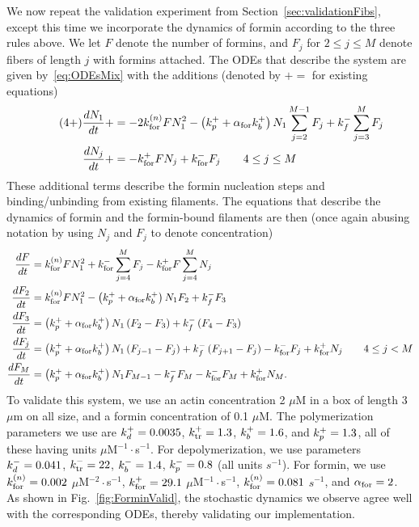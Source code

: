 \documentclass[11pt]{article}
\begin{document}
\begin{appendices}
We now repeat the validation experiment from Section\ \ref{sec:validationFibs}, except this time we incorporate the dynamics of formin according to the three rules above. We let $F$ denote the number of formins, and $F_j$ for $2 \leq j \leq M$ denote fibers of length $j$ with formins attached. The ODEs that describe the system are given by\ \eqref{eq:ODEsMix} with the additions (denoted by $+=$ for existing equations)
\begin{align*}
\label{eq:1plus}
\tag{4+}
\frac{d N_1}{dt} +&= -2k_\text{for}^{(n)} FN_1^2 - \left(k_p^+ +\alpha_\text{for} k_b^+\right)N_1 \sum_{j=2}^{M-1} F_j+k_f^- \sum_{j=3}^M  F_j\\
\frac{d N_j}{dt} +& = -k_\text{for}^+ F N_j + k_\text{for}^- F_j \qquad 4 \leq j \leq M
\end{align*}
These additional terms describe the formin nucleation steps and binding/unbinding from existing filaments. The equations that describe the dynamics of formin and the formin-bound filaments are then (once again abusing notation by using $N_j$ and $F_j$ to denote concentration)
\begin{subequations}
\label{eq:ODEsFormin}
\begin{align}
\frac{d F}{dt} &=k_\text{for}^{(n)} FN_1^2+k_\text{for}^- \sum_{j=4}^{M} F_j - k_\text{for}^+ F \sum_{j=4}^M N_j \\
\frac{d F_2}{dt} &= k_\text{for}^{(n)} FN_1^2 -\left(k_p^+ +\alpha_\text{for} k_b^+\right)N_1F_2 + k_f^- F_3 \\
\frac{d F_3}{dt} &= \left(k_p^+ +\alpha_\text{for} k_b^+\right)N_1\left(F_2-F_3\right) + k_f^- \left(F_4-F_3\right) \\
\frac{d F_j}{dt} & =\left(k_p^+ +\alpha_\text{for} k_b^+\right)N_1\left(F_{j-1}-F_j\right) + k_f^- \left(F_{j+1}-F_j\right) - k_\text{for}^- F_j + k_\text{for}^+ N_j \qquad 4 \leq j < M \\
\frac{d F_M}{dt} & = \left(k_p^+ +\alpha_\text{for} k_b^+\right)N_1 F_{M-1} - k_f^- F_M - k_\text{for}^- F_M + k_\text{for}^+ N_M.
\end{align}
\end{subequations}
To validate this system, we use an actin concentration 2 $\mu$M in a box of length 3 $\mu$m on all size, and a formin concentration of 0.1 $\mu$M. The polymerization parameters we use are $k_d^+=0.0035$, $k_\text{tr}^+=1.3$, $k_b^+=1.6$, and $k_p^+=1.3$, all of these having units $\mu$M$^{-1}\cdot$s$^{-1}$. For depolymerization, we use parameters $k_d^- = 0.041$, $k_\text{tr}^- = 22$, $k_b^-=1.4$, $k_p^-=0.8$ (all units $s^{-1}$). For formin, we use $k_\text{for}^{(n)} = 0.002$ $\mu$M$^{-2}\cdot$s$^{-1}$, $k_\text{for}^+ = 29.1$ $\mu$M$^{-1}\cdot$s$^{-1}$, $k_\text{for}^{(n)} = 0.081$ $s^{-1}$, and $\alpha_\text{for}=2$. As shown in Fig.\ \ref{fig:ForminValid}, the stochastic dynamics we observe agree well with the corresponding ODEs, thereby validating our implementation.


\end{appendices}
\end{document}
